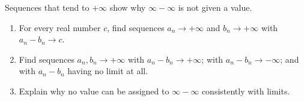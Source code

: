 Sequences that tend to $+\infty$ show why $\infty-\infty$ is not given a value.
\begin{enumerate}
\item[(a)] For every real number $c$, find sequences $a_n\to+\infty$ and $b_n\to+\infty$ with $a_n-b_n\to c$.
\item[(b)] Find sequences $a_n,b_n\to+\infty$ with $a_n-b_n\to+\infty$; with $a_n-b_n\to-\infty$; and with $a_n-b_n$ having no limit at all.
\item[(c)] Explain why no value can be assigned to $\infty-\infty$ consistently with limits.
\end{enumerate}
